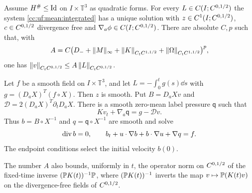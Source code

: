 \begin{theorem}\label{cc:uf:mean:inverse}
Assume $H^\#\le\operatorname{Id}$ on $I\times\mathbb T^3$ as quadratic forms. For
every $L\in C(I;C^{0,1/2})$ the system
\eqref{cc:uf:mean:integrated} has a unique solution with
$z\in C^1(I;C^{0,1/2})$, $c\in C^{0,1/2}$ divergence free and
$\nabla_a\phi\in C(I;C^{0,1/2})$. There are absolute $C,p$ such that, with
\begin{equation}\label{cc:uf:mean:base-constant}
 A=C\bigl(D_-+\|M\|_\infty+\left\lVert K\right\rVert_{C_tC^{1,1/2}}
   +\left\lVert\Omega\right\rVert_{C_tC^{1,1/2}}\bigr)^p,
\end{equation}
one has $\left\lVert v\right\rVert_{C_tC^{0,1/2}}\le A\left\lVert L\right\rVert_{C_tC^{0,1/2}}$.

Let $f$ be a smooth field on $I\times\mathbb T^3$, and let
$L=-\int_0^tg(s)\dd s$ with $g=(D_aX)^T(f\circ X)$. Then $z$ is smooth.
Put $B=D_aX v$ and $\mathcal D=2(D_aX)^T\partial_t D_aX$.
There is a smooth zero-mean label pressure $\mathsf q$ such that
\begin{equation}\label{cc:uf:mean:strong}
 Kv_t+\nabla_a\mathsf q=g-\mathcal Dv.
\end{equation}
Thus $b=B\circ X^{-1}$ and $q=\mathsf q\circ X^{-1}$ are smooth and solve
\begin{equation}\label{cc:uf:mean:physical}
 \operatorname{div} b=0,\qquad
 b_t+u\cdot\nabla b+b\cdot\nabla u+\nabla q=f.
\end{equation}
The endpoint conditions select the initial velocity $b(0)$.

The number $A$ also bounds, uniformly in $t$, the operator norm on
$C^{0,1/2}$ of the fixed-time inverse $(\mathbb P K(t))^{-1}\mathbb P$, where
$(\mathbb P K(t))^{-1}$ inverts the map $v\mapsto\mathbb P(K(t)v)$ on the
divergence-free fields of $C^{0,1/2}$.
\end{theorem}
